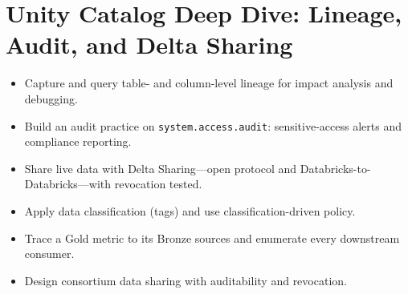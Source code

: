 \chapter{Unity Catalog Deep Dive: Lineage, Audit, and Delta Sharing}
%
%
\begin{objectives}
\begin{itemize}
    \item Capture and query table- and column-level lineage for impact analysis and debugging.
    \item Build an audit practice on \texttt{system.access.audit}: sensitive-access alerts and compliance reporting.
    \item Share live data with Delta Sharing---open protocol and Databricks-to-Databricks---with revocation tested.
    \item Apply data classification (tags) and use classification-driven policy.
    \item Trace a Gold metric to its Bronze sources and enumerate every downstream consumer.
    \item Design consortium data sharing with auditability and revocation.
\end{itemize}
\end{objectives}

